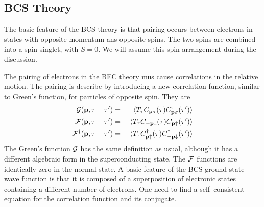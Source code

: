 \subsection{BCS Theory}
The basic feature of the BCS theory is that pairing occurs between electrons in states with opposite momentum ans opposite spins.
The two spins are combined into a spin singlet, with $S=0$.
We will assume this spin arrangement during the discussion.

The pairing of electrons in the BEC theory mus cause correlations in the relative motion.
The pairing is describe by introducing a new correlation function, similar to Green's function, for particles of opposite spin.
They are
\begin{eqnarray}
    \mathcal{G}(\mathbf{p}, \tau-\tau') &=& - \langle T_\tau C_{\mathbf{p}\sigma} (\tau) C^\dagger_{\mathbf{p}\sigma}(\tau') \rangle \nonumber \\
    \mathcal{F}(\mathbf{p}, \tau-\tau') &=& \langle T_\tau C_{-\mathbf{p}\downarrow}(\tau) C_{\mathbf{p}\uparrow}(\tau') \rangle \label{10.31} \\
    \mathcal{F}^\dagger (\mathbf{p},\tau-\tau') &=& \langle T_\tau C^\dagger_{\mathbf{p}\uparrow}(\tau) C^\dagger_{-\mathbf{p}\downarrow}(\tau') \rangle \nonumber
\end{eqnarray}
The Green's function $\mathcal{G}$ has the same definition as usual, although it has a different algebraic form in the superconducting state.
The $\mathcal{F}$ functions are identically zero in the normal state.
A basic feature of the BCS ground state wave function is that it is composed of a superposition of electronic states containing a different number of electrons.
One need to find a self--consistent equation for the correlation function and its conjugate.

